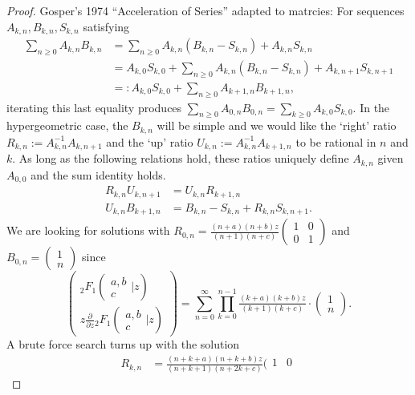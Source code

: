 \documentclass[12pt]{article}
\numberwithin{equation}{section}
\newcommand{\Head}[3] {{}_{#1}{#2}_{#3}}
\newcommand{\ArgS}[3] {( \begin{smallmatrix} #1 \\ #2 \end{smallmatrix} | {#3})}
\begin{document}
\begin{proof}
Gosper's 1974 ``Acceleration of Series'' adapted to matrcies: For sequences $A_{k,n}, B_{k,n}, S_{k,n}$ satisfying
\begin{align*}
\sum_{n \ge 0} A_{k,n} B_{k,n} &= \sum_{n \ge 0} A_{k,n} (B_{k,n}-S_{k,n}) + A_{k,n} S_{k,n}\\
&= A_{k,0} S_{k,0} + \sum_{n \ge 0} A_{k,n} (B_{k,n}-S_{k,n}) + A_{k,n+1} S_{k,n+1}\\
&=: A_{k,0} S_{k,0} + \sum_{n \ge 0} A_{k+1,n} B_{k+1,n}\text{,}
\end{align*}
iterating this last equality produces $\sum_{n \ge 0} A_{0,n} B_{0,n} = \sum_{k \ge 0} A_{k,0} S_{k,0}$. In the hypergeometric case, the $B_{k,n}$ will be simple and we would like the `right' ratio $R_{k,n} := A_{k,n}^{-1} A_{k,n+1}$ and the `up' ratio $U_{k,n} := A_{k,n}^{-1} A_{k+1,n}$ to be rational in $n$ and $k$. As long as the following relations hold, these ratios uniquely define $A_{k,n}$ given $A_{0,0}$ and the sum identity holds.
\begin{align*}
R_{k,n} U_{k,n+1} &= U_{k,n} R_{k+1,n}\\
U_{k,n} B_{k+1,n} &= B_{k,n} - S_{k,n} + R_{k,n}S_{k,n+1}\text{.}
\end{align*}
We are looking for solutions with $R_{0,n} = \frac{(n+a)(n+b)z}{(n+1)(n+c)} (\begin{smallmatrix}
1 & 0 \\
0 & 1
\end{smallmatrix})$ and $B_{0,n} = (\begin{smallmatrix}
1 \\
n
\end{smallmatrix})$ since
\begin{equation*}
\begin{pmatrix}
\Head{2}{F}{1} \ArgS{a,b}{c}{z} \\ z \frac{\partial}{\partial z} \Head{2}{F}{1}\ArgS{a,b}{c}{z}
\end{pmatrix}
 = \sum_{n=0}^{\infty}
\prod_{k=0}^{n-1}
\tfrac{(k+a)(k+b)z}{(k+1)(k+c)}
\cdot \left(\begin{smallmatrix}
1 \\
n
\end{smallmatrix}\right)\text{.}
\end{equation*}
A brute force search turns up with the solution
\begin{align*}
R_{k,n} &= \tfrac{(n+k+a)(n+k+b)z}{(n+k+1)(n+2k+c)} (\begin{smallmatrix}
1 & 0 \\

\end{smallmatrix}
\end{align*}
\end{proof}
\end{document}

